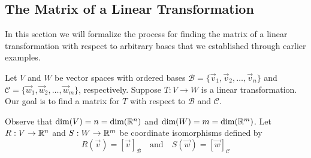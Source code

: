 \documentclass{ximera}
\begin{document}





\subsection*{The Matrix of a Linear Transformation}
In this section we will formalize the process for finding the matrix of a linear transformation with respect to arbitrary bases that we established through earlier examples.

Let $V$ and $W$ be vector spaces with ordered bases $\mathcal{B}=\{\vec{v}_1, \vec{v}_2,\ldots ,\vec{v}_n\}$ and $\mathcal{C}=\{\vec{w}_1, \vec{w}_2,\ldots ,\vec{w}_m\}$, respectively.   Suppose $T:V\rightarrow W$ is a linear transformation.  Our goal is to find a matrix for $T$ with respect to $\mathcal{B}$ and $\mathcal{C}$.

Observe that $\text{dim}(V)=n=\text{dim}(\mathbb{R}^n)$ and $\text{dim}(W)=m=\text{dim}(\mathbb{R}^m)$. Let $R:V\rightarrow \mathbb{R}^n$ and $S:W\rightarrow \mathbb{R}^m$ be coordinate isomorphisms defined by
$$R(\vec{v})=[\vec{v}]_{\mathcal{B}}\quad\text{and}\quad S(\vec{w})=[\vec{w}]_{\mathcal{C}}$$
\end{document}

